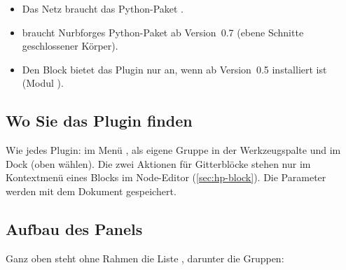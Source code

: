 \begin{itemize}
  \item Das Netz  braucht das Python-Paket .
  \item {} braucht Nurbforges Python-Paket  ab
    Version~0.7 (ebene Schnitte geschlossener Körper).
  \item Den Block  bietet das Plugin nur an, wenn  ab
    Version~0.5 installiert ist (Modul ).
\end{itemize}

\subsection{Wo Sie das Plugin finden}

Wie jedes Plugin: im Menü , als eigene Gruppe in der Werkzeugspalte und im
Dock  (oben  wählen). Die zwei Aktionen für Gitterblöcke stehen nur im
Kontextmenü eines Blocks  im Node-Editor (\autoref{sec:hp-block}). Die
Parameter werden mit dem Dokument gespeichert.

\subsection{Aufbau des Panels}\label{sec:hp-panel}

Ganz oben steht ohne Rahmen die Liste , darunter die Gruppen:

